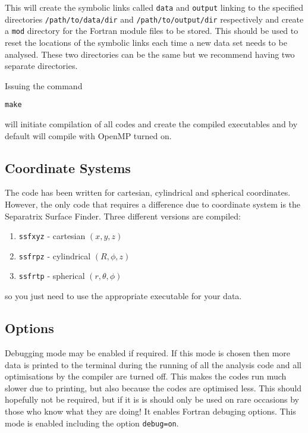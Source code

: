 \documentclass[12pt]{article}
\begin{document}
    This will create the symbolic links called \texttt{data} and \texttt{output} linking to the specified directories \texttt{/path/to/data/dir} and \texttt{/path/to/output/dir} respectively and create a \texttt{mod} directory for the Fortran module files to be stored. This should be used to reset the locations of the symbolic links each time a new data set needs to be analysed. These two directories can be the same but we recommend having two separate directories.

    Issuing the command

    \texttt{make}

    will initiate compilation of all codes and create the compiled executables and by default will compile with OpenMP turned on.

    \subsection{Coordinate Systems}
      \label{sec:coord}

      The code has been written for cartesian, cylindrical and spherical coordinates. However, the only code that requires a difference due to coordinate system is the Separatrix Surface Finder. Three different versions are compiled:
      \begin{enumerate}
        \item \texttt{ssfxyz} - cartesian \( (x, y, z) \)
        \item \texttt{ssfrpz} - cylindrical \( (R, \phi, z) \)
        \item \texttt{ssfrtp} - spherical \( (r, \theta, \phi) \)
      \end{enumerate}
      so you just need to use the appropriate executable for your data.

    \subsection{Options}




      Debugging mode may be enabled if required. If this mode is chosen then more data is printed to the terminal during the running of all the analysis code and all optimisations by the compiler are turned off. This makes the codes run much slower due to printing, but also because the codes are optimised less. This should hopefully not be required, but if it is is should only be used on rare occasions by those who know what they are doing! It enables Fortran debuging options. This mode is enabled including the option \texttt{debug=on}.
\end{document}

